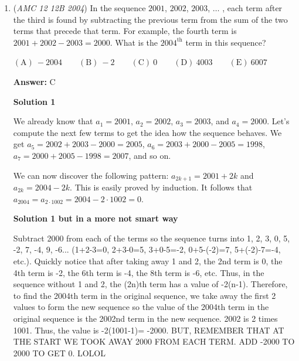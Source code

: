 \begin{enumerate}
 Because of the extra five people we know that the total amount of people is $12.5$, however, to adjust for the complexity of not every score being a $60$ we round up to $13$. Giving $\boxed{\mathrm{(D)}\ 13}$.

 


	\item (\textit{AMC 12 12B 2004}) In the sequence $2001$, $2002$, $2003$, $\ldots$ , each term after the third is found by subtracting the previous term from the sum of the two terms that precede that term. For example, the fourth term is $2001 + 2002 - 2003 = 2000$. What is the
$2004^\textrm{th}$ term in this sequence?


 $\mathrm{(A) \ } -2004 \qquad \mathrm{(B) \ } -2 \qquad \mathrm{(C) \ } 0 \qquad \mathrm{(D) \ } 4003 \qquad \mathrm{(E) \ } 6007$

 \textbf{Answer: }C



\textbf{Solution 1}

We already know that $a_1=2001$, $a_2=2002$, $a_3=2003$, and $a_4=2000$. Let's compute the next few terms to get the idea how the sequence behaves. We get $a_5 = 2002+2003-2000 = 2005$, $a_6=2003+2000-2005=1998$, $a_7=2000+2005-1998=2007$, and so on.

 We can now discover the following pattern: $a_{2k+1} = 2001+2k$ and $a_{2k}=2004-2k$. This is easily proved by induction. It follows that $a_{2004}=a_{2\cdot 1002} = 2004 - 2\cdot 1002 = \boxed{0}$.

 



\textbf{Solution 1 but in a more not smart way}

Subtract 2000 from each of the terms so the sequence turns into 1, 2, 3, 0, 5, -2, 7, -4, 9, -6... (1+2-3=0, 2+3-0=5, 3+0-5=-2, 0+5-(-2)=7, 5+(-2)-7=-4, etc.). Quickly notice that after taking away 1 and 2, the 2nd term is 0, the 4th term is -2, the 6th term is -4, the 8th term is -6, etc. Thus, in the sequence without 1 and 2, the (2n)th term has a value of -2(n-1). Therefore, to find the 2004th term in the original sequence, we take away the first 2 values to form the new sequence so the value of the 2004th term in the original sequence is the 2002nd term in the new sequence. 2002 is 2 times 1001. Thus, the value is -2(1001-1)= -2000. BUT, REMEMBER THAT AT THE START WE TOOK AWAY 2000 FROM EACH TERM. ADD -2000 TO 2000 TO GET $\boxed{0}$. LOLOL

 




\end{enumerate}
